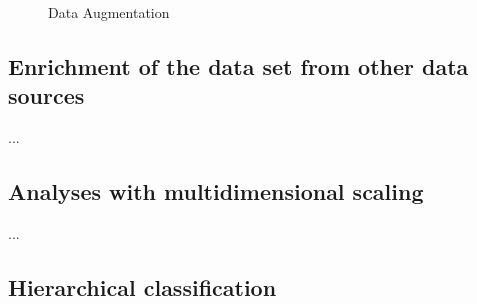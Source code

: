 \documentclass[10pt]{article}
\newcommand\inputpgf[2]{{
\let\pgfimageWithoutPath\pgfimage
\renewcommand{\pgfimage}[2][]{\pgfimageWithoutPath[##1]{#1/##2}}

}}
\newif\ifen
\newif\ifde
\newcommand{\en}[1]{\ifen#1\fi}
\newcommand{\de}[1]{\ifde#1\fi}
\begin{document}
			\begin{figure}[H]
				\begin{center}
					\inputpgf{images/pgf}{augment.pgf}
				\end{center}
				\caption{Data Augmentation}
				\label{fig:data_augmentation}
			\end{figure}

		\subsection{Enrichment of the data set from other data sources}
			\noindent ...
		
		\subsection{Analyses with multidimensional scaling}
			\noindent ...
		
		\subsection{Hierarchical classification}
			\de{Durch die Verwendung eines einzigen Modelles für alle Klassen, sind die bisherigen Klassifikatoren darauf trainiert, den Verlust am Klassenausgabevektor zu minimieren. Jede bisher verwendete Klasse hat den gleichen Rang sowohl beim Training, als auch bei der Klassifizierung. Die Vorhersage von "Pizza" kostet genauso viel wie die Vorhersage von "Martini".}
			\en{By using a single model for all classes, previous classifiers have been trained to minimize the loss of the class output vector. Each class used so far has the same rank in both training and classification. The prediction of "Pizza" costs the same as the prediction of "Martini".}

			\de{Die menschliche Fähigkeit Objekte einordnen zu können, funktioniert nicht nur auf einer Ebene. Kategorien werden sich natürlich überlappen und eine hierarchische Struktur aufweisen. So wird ein Mensch ein Bild beispielsweise unter "Pizza", "Thunfischpizza" oder sogar "Fastfood" einordnen, was so gesehen korrekt ist. Je nach Einordnung findet hier lediglich ein "Informationsverlust" statt. Jedoch wird der Mensch eine "Pizza" meist nicht fälschlicherweise als "Martini" verwechseln, welcher eher der Kategorie "Getränk" oder "Cocktail" einzuordnen ist\autocite{rosch2004basic}.}
			\en{The human ability to classify objects does not only work on one level. Categories will naturally overlap and have a hierarchical structure. For example, a human will classify a picture under "pizza", "tuna pizza" or even "fast food", which is correct from this point of view. Depending on the classification, there will only be a "loss of information". However, a person will not mistake a "pizza" as a "Martini", which is more likely to be classified as a "drink" or "cocktail"\autocite{rosch2004basic}.}
		
\end{document}
